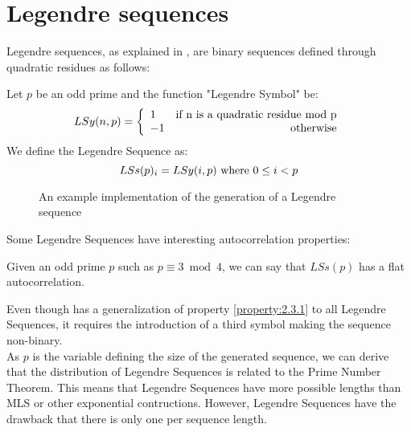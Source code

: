 \section{Legendre sequences}

Legendre sequences, as explained in \citet{legendre_sequences}, are binary
sequences defined through quadratic residues as follows:

\begin{definition}
  Let $p$ be an odd prime and the function "Legendre Symbol" be:
    \begin{equation}
      LSy(n, p) = \left\{\begin{array}{lr}
          1  & \textnormal{if n is a quadratic residue mod p}   \\
          -1 & \textnormal{otherwise} \\
      \end{array}\right.
    \end{equation}
  We define the Legendre Sequence as:
    \begin{equation}
      LSs(p)_{i} = LSy(i, p) \textnormal{  where  } 0 \leq i < p
    \end{equation}
\end{definition}

\begin{figure}[ht!]
  \caption{An example implementation of the generation of a Legendre sequence}
  \label{}
\end{figure}

Some Legendre Sequences have interesting autocorrelation properties:
\begin{property}\label{property:2.3.1}
  Given an odd prime $p$ such as $p \equiv 3 \bmod 4$, we can say that
  $LSs(p)$ has a flat autocorrelation.\cite{legendre_sequences}
\end{property}

Even though \citet{legendre_sequences} has a generalization of property
\ref{property:2.3.1} to all Legendre Sequences, it requires the introduction of
a third symbol making the sequence non-binary. \\

As $p$ is the variable defining the size of the generated sequence, we can
derive that the distribution of Legendre Sequences is related to the Prime
Number Theorem. This means that Legendre Sequences have more possible lengths
than MLS or other exponential contructions. However, Legendre Sequences have
the drawback that there is only one per sequence length.
